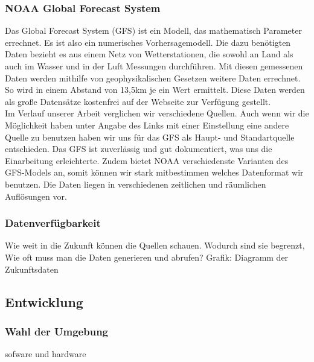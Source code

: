 \subsubsection*{NOAA Global Forecast System} %
Das Global Forecast System (GFS)  ist ein Modell, das mathematisch Parameter errechnet.
Es ist also ein numerisches Vorhersagemodell.
Die dazu benötigten Daten bezieht es aus einem Netz von Wetterstationen,
die sowohl an Land als auch im Wasser und in der Luft Messungen durchführen.
Mit diesen gemessenen Daten werden mithilfe von geophysikalischen Gesetzen weitere Daten errechnet.
So wird in einem Abstand von 13,5km je ein Wert ermittelt.
Diese Daten werden als große Datensätze kostenfrei auf der Webseite  \cite{ncep}  zur Verfügung gestellt.\\
Im Verlauf unserer Arbeit verglichen wir verschiedene Quellen.
Auch wenn wir die Möglichkeit haben unter Angabe des Links mit einer Einstellung eine andere Quelle zu benutzen haben wir uns für das GFS als Haupt- und Standartquelle entschieden.
Das GFS ist zuverlässig und gut dokumentiert, was uns die Einarbeitung erleichterte.
Zudem bietet NOAA verschiedenste Varianten des GFS-Models an, somit können wir stark mitbestimmen welches Datenformat wir benutzen.
Die Daten liegen in verschiedenen zeitlichen und räumlichen Auflösungen vor.

\subsubsection{Datenverfügbarkeit} %
Wie weit in die Zukunft können die Quellen schauen.
Wodurch sind sie begrenzt,
Wie oft muss man die Daten generieren und abrufen?
Grafik: Diagramm der Zukunftsdaten

\subsection{Entwicklung} %

\subsubsection{Wahl der Umgebung}\label{sec:ent} %
sofware und hardware

